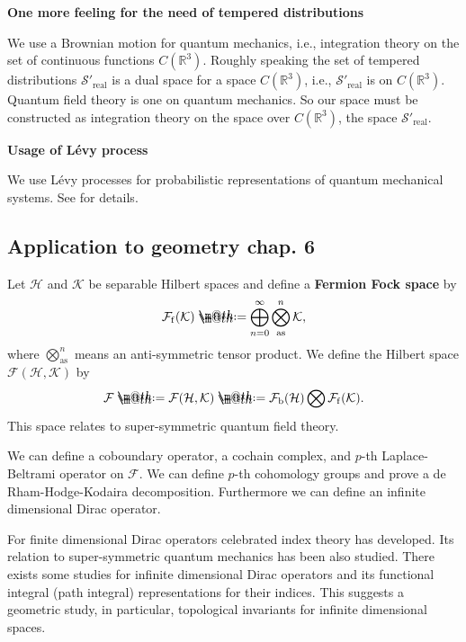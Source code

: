 \documentclass[openany, a4paper, oneside]{jsbook}
\makeatletter
\newcommand*{\defeq}{\mathrel{\rlap{%
\raisebox{0.3ex}{$\m@th\cdot$}}%
\raisebox{-0.3ex}{$\m@th\cdot$}}%
=}
\theoremstyle{break}
\theoremstyle{breakdefn}
\newcommand{\bbR}{\mathbb{R}}
\newcommand{\calF}{\mathcal{F}}
\newcommand{\calFb}{\mathcal{F}_{\mathrm{b}}}
\newcommand{\calFf}{\mathcal{F}_{\mathrm{f}}}
\newcommand{\calH}{\mathcal{H}}
\newcommand{\calK}{\mathcal{K}}
\newcommand{\realtempereddist}{\mathcal{S}'_{\mathrm{real}}}
\makeatother
\begin{document}
\vspace{1em}

\textbf{One more feeling for the need of tempered distributions}

We use a Brownian motion for quantum mechanics, i.e.,
integration theory on the set of continuous functions $C (\bbR^3)$.
Roughly speaking the set of tempered distributions $\realtempereddist$ is a dual space for a space $C (\bbR^3)$,
i.e., $\realtempereddist$ is on $C (\bbR^3)$.
Quantum field theory is one on quantum mechanics.
So our space must be constructed as integration theory on the space over $C (\bbR^3)$, the space $\realtempereddist$.

\vspace{1em}

\textbf{Usage of L\'evy process}

We use L\'evy processes for probabilistic representations of quantum mechanical systems.
See \cite{LorincziHiroshimaBetz1} for details.
\subsection{Application to geometry \cite{AsaoArai1} chap. 6}


Let $\calH$ and $\calK$ be separable Hilbert spaces
and define a \textbf{Fermion Fock space} by
\begin{align}
 \calFf (\calK)
 \defeq
 \bigoplus_{n=0}^{\infty} \bigotimes_{\mathrm{as}}^n \calK,
\end{align}
where $\bigotimes_{\mathrm{as}}^n$ means an anti-symmetric tensor product.
We define the Hilbert space $\calF (\calH, \calK)$ by
\begin{align}
 \calF \defeq \calF (\calH, \calK) \defeq \calFb (\calH) \bigotimes \calFf (\calK).
\end{align}
This space relates to super-symmetric quantum field theory.

We can define a coboundary operator, a cochain complex,
and $p$-th Laplace-Beltrami operator on $\calF$.
We can define $p$-th cohomology groups
and prove a de Rham-Hodge-Kodaira decomposition.
Furthermore we can define an infinite dimensional Dirac operator.

For finite dimensional Dirac operators celebrated index theory has developed.
Its relation to super-symmetric quantum mechanics has been also studied.
There exists some studies for infinite dimensional Dirac operators
and its functional integral (path integral) representations
for their indices.
This suggests a geometric study, in particular, topological invariants for infinite dimensional spaces.
\end{document}
